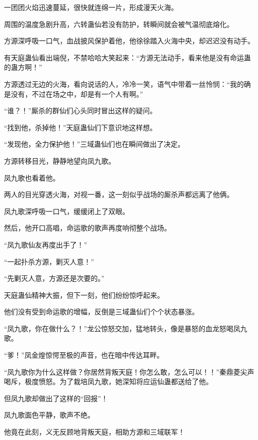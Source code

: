 \begin{this_body}
一团团火焰迅速蔓延，很快就连绵一片，形成漫天火海。

周围的温度急剧升高，六转蛊仙若没有防护，转瞬间就会被气温彻底熔化。

方源深呼吸一口气，血战披风保护着他，他徐徐踏入火海中央，却迟迟没有动手。

有天庭蛊仙看出端倪，不禁哈哈大笑起来：“方源无法动手，看来他是没有命运蛊的蛊方啊！”

方源透过无边的火海，看向说话的人，冷冷一笑，语气中带着一丝怜悯：“我的确是没有，不过在场之中，却是有一个人有啊。”

“谁？！”厮杀的群仙们心头同时冒出这样的疑问。

“找到他，杀掉他！”天庭蛊仙们下意识地这样想。

“发现他，全力保护他！”三域蛊仙们也在瞬间做出了决定。

方源转移目光，静静地望向凤九歌。

凤九歌也看着他。

两人的目光穿透火海，对视一番，这一刻似乎战场的厮杀声都远离了他俩。

凤九歌深呼吸一口气，缓缓闭上了双眼。

然后，他开口高唱，命运歌的歌声再度响彻整个战场。

“凤九歌仙友再度出手了！”

“一起扑杀方源，剿灭人意！”

“先剿灭人意，方源还是次要的。”

天庭蛊仙精神大振，但下一刻，他们纷纷惊呼起来。

他们没有受到命运歌的增幅，反倒是三域蛊仙们个个状态暴涨。

“凤九歌，你在做什么？！”龙公惊怒交加，猛地转头，像是暴怒的血龙怒喝凤九歌。

“爹！”凤金煌惊愕至极的声音，也在暗中传达耳畔。

“凤九歌你为什么这样做？你居然背叛天庭！你怎么敢，怎么可以！！”秦鼎菱尖声喝斥，极度愤怒。为了栽培凤九歌，她深知将应运仙蛊都送给了他。

但凤九歌却做出了这样的“回报”！

凤九歌面色平静，歌声不绝。

他竟在此刻，义无反顾地背叛天庭，相助方源和三域联军！

\end{this_body}

